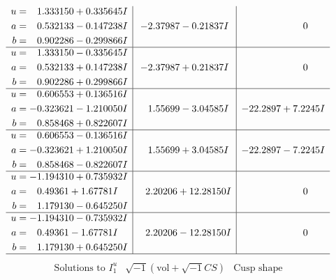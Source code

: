 \documentclass[1p]{elsarticle_modified}
\theoremstyle{definition}
\newcommand{\I}{\sqrt{-1}}
\begin{document}
$$\begin{array}{c|c|c}
\begin{aligned}
u &= \phantom{-}1.333150 + 0.335645 I \\
a &= \phantom{-}0.532133 - 0.147238 I \\
b &= \phantom{-}0.902286 - 0.299866 I\end{aligned}
 & -2.37987 - 0.21837 I & \phantom{-0.000000 } 0 \\ \hline\begin{aligned}
u &= \phantom{-}1.333150 - 0.335645 I \\
a &= \phantom{-}0.532133 + 0.147238 I \\
b &= \phantom{-}0.902286 + 0.299866 I\end{aligned}
 & -2.37987 + 0.21837 I & \phantom{-0.000000 } 0 \\ \hline\begin{aligned}
u &= \phantom{-}0.606553 + 0.136516 I \\
a &= -0.323621 - 1.210050 I \\
b &= \phantom{-}0.858468 + 0.822607 I\end{aligned}
 & \phantom{-}1.55699 - 3.04585 I & -22.2897 + 7.2245 I \\ \hline\begin{aligned}
u &= \phantom{-}0.606553 - 0.136516 I \\
a &= -0.323621 + 1.210050 I \\
b &= \phantom{-}0.858468 - 0.822607 I\end{aligned}
 & \phantom{-}1.55699 + 3.04585 I & -22.2897 - 7.2245 I \\ \hline\begin{aligned}
u &= -1.194310 + 0.735932 I \\
a &= \phantom{-}0.49361 + 1.67781 I \\
b &= \phantom{-}1.179130 - 0.645250 I\end{aligned}
 & \phantom{-}2.20206 + 12.28150 I & \phantom{-0.000000 } 0 \\ \hline\begin{aligned}
u &= -1.194310 - 0.735932 I \\
a &= \phantom{-}0.49361 - 1.67781 I \\
b &= \phantom{-}1.179130 + 0.645250 I\end{aligned}
 & \phantom{-}2.20206 - 12.28150 I & \phantom{-0.000000 } 0\\
 \hline 
 \end{array}$$\newpage$$\begin{array}{c|c|c}  
\text{Solutions to }I^u_{1}& \I (\text{vol} + \sqrt{-1}CS) & \text{Cusp shape}\\

\end{array}$$
\end{document}
